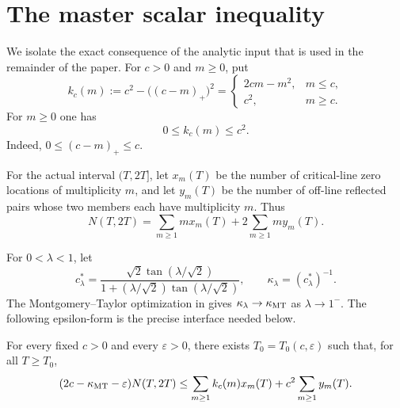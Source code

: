 \section{The master scalar inequality}

We isolate the exact consequence of the analytic input that is used in the remainder of the paper.  For $c>0$ and $m\geq0$, put
\begin{equation}\label{eq:kc}
k_c(m):=c^2-\bigl((c-m)_+\bigr)^2
=\begin{cases}
2cm-m^2,&m\leq c,\\
c^2,&m\geq c.
\end{cases}
\end{equation}
For $m\geq0$ one has
\begin{equation}\label{eq:kcbounds}
0\leq k_c(m)\leq c^2.
\end{equation}
Indeed, $0\leq(c-m)_+\leq c$.

For the actual interval $(T,2T]$, let $x_m(T)$ be the number of critical-line zero locations of multiplicity $m$, and let $y_m(T)$ be the number of off-line reflected pairs whose two members each have multiplicity $m$.  Thus
\begin{equation}\label{eq:countidentity}
N(T,2T)=\sum_{m\geq1}m x_m(T)+2\sum_{m\geq1}m y_m(T).
\end{equation}

For $0<\lambda<1$, let
\[
c_\lambda^*=
\frac{\sqrt2\tan(\lambda/\sqrt2)}
{1+(\lambda/\sqrt2)\tan(\lambda/\sqrt2)},
\qquad
\kappa_\lambda=(c_\lambda^*)^{-1}.
\]
The Montgomery--Taylor optimization in \cite{Claude2026} gives $\kappa_\lambda\to\kappa_{\mathrm{MT}}$ as $\lambda\to1^-$.  The following epsilon-form is the precise interface needed below.

\begin{proposition}\label{prop:master}
For every fixed $c>0$ and every $\varepsilon>0$, there exists $T_0=T_0(c,\varepsilon)$ such that, for all $T\geq T_0$,
\begin{equation}\label{eq:master}
(2c-\kappa_{\mathrm{MT}}-\varepsilon)N(T,2T)
\leq
\sum_{m\geq1}k_c(m)x_m(T)+c^2\sum_{m\geq1}y_m(T).
\end{equation}
\end{proposition}

